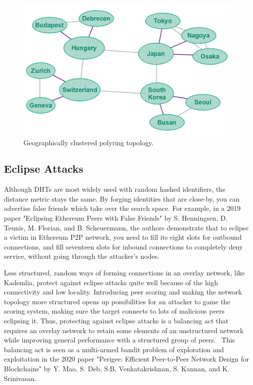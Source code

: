 \begin{figure}
	\includegraphics[width=\textwidth]{pictures/geographical-polyring.png}
	\caption{Geographically clustered polyring topology.\cite{Jenkov_undated-kl}}
	\label{Geographical Polyring}
\end{figure}


\subsection{Eclipse Attacks}
Although DHTs are most widely used with random hashed identifiers, the distance metric stays the same. By forging identities that are close-by, you can advertise false friends which take over the search space. For example, in a 2019 paper "Eclipsing Ethereum Peers with False Friends" by S. Henningsen, D. Teunis, M. Florian, and B. Scheuermann, the authors demonstrate that to eclipse a victim in Ethereum P2P network, you need to fill its eight slots for outbound connections, and fill seventeen slots for inbound connections to completely deny service, without going through the attacker's nodes.~\cite{Henningsen2019-mf}

Less structured, random ways of forming connections in an overlay network, like Kademlia, protect against eclipse attacks quite well because of the high connectivity and low locality. Introducing peer scoring and making the network topology more structured opens up possibilities for an attacker to game the scoring system, making sure the target connects to lots of malicious peers eclipsing it. Thus, protecting against eclipse attacks is a balancing act that requires an overlay network to retain some elements of an unstructured network while improving general performance with a structured group of peers.~\cite{Mao2020-ee} This balancing act is seen as a multi-armed bandit problem of exploration and exploitation in the 2020 paper "Perigee: Efficient Peer-to-Peer Network Design for Blockchains" by Y. Mao, S. Deb, S.B. Venkatakrishnan, S. Kannan, and K. Srinivasan.

